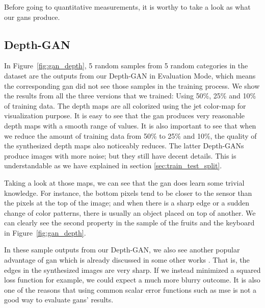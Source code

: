 Before going to quantitative measurements, it is worthy to take a look as what our
\acrshort{gan}s produce.

\subsection{Depth-GAN}
\label{sub:depth_gan}

In Figure~\ref{fig:gan_depth}, 5 random samples from 5 random categories in the dataset
are the outputs from our Depth-GAN in Evaluation Mode, which means the corresponding
\acrshort{gan} did not see those samples in the training process.  We show the results
from all the three versions that we trained: Using 50\%, 25\% and 10\% of training data.
The depth maps are all colorized using the jet color-map for visualization purpose. It is
easy to see that the \acrshort{gan} produces very reasonable depth maps with a smooth
range of values. It is also important to see that when we reduce the amount of training
data from 50\% to 25\% and 10\%, the quality of the synthesized depth maps also noticeably
reduces. The latter Depth-GANs produce images with more noise; but they still have decent
details. This is understandable as we have explained in section
\ref{sec:train_test_split}.

Taking a look at those maps, we can see that the \acrshort{gan} does learn some trivial
knowledge. For instance, the bottom pixels tend to be closer to the sensor than the pixels
at the top of the image; and when there is a sharp edge or a sudden change of color
patterns, there is usually an object placed on top of another. We can clearly see the
second property in the sample of the fruits and the keyboard in Figure~\ref{fig:gan_depth}.

In these sample outputs from our Depth-GAN, we also see another popular advantage of
\acrshort{gan} which is already discussed in some other works \cite{gan, cogan, pix2pix}.
That is, the edges in the synthesized images are very sharp. If we instead minimized a
squared loss function for example, we could expect a much more blurry outcome. It is also
one of the reasons that using common scalar error functions such as \acrshort{mse} is not
a good way to evaluate \acrshort{gan}s' results.

\clearpage

